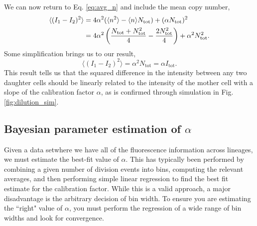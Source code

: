 We can now return to Eq. \ref{eq:avg_n} and include the mean copy number,
\begin{align}
\langle (I_1 - I_2)^2 \rangle &= 4\alpha^2(\langle n^2 \rangle - \langle n \rangle N_\text{tot}) + (\alpha N_\text{tot})^2\\
& = 4\alpha^2\left({N_\text{tot} + N_\text{tot}^2 \over 4} - {2N_\text{tot}^2 \over 4}\right) + \alpha^2N_\text{tot}^2.
\end{align}
Some simplification brings us to our result,
\begin{equation}
\langle (I_1 - I_2)^2 \rangle = \alpha^2 N_\text{tot} = \alpha I_\text{tot}.
\label{eq:golden_rule}
\end{equation}
This result tells us that the squared difference in the intensity between any
two daughter cells should be linearly related to the intensity of the mother
cell with a slope of the calibration factor $\alpha$, as is confirmed through
simulation in Fig. \ref{fig:dilution_sim}.


\begin{figure}
\end{figure}


\subsection*{Bayesian parameter estimation of $\alpha$}
Given a data setwhere we have all of the fluorescence information across lineages,
we must estimate the best-fit value of $\alpha$. This has typically been performed
by combining a given number of division events into bins, computing the relevant
averages, and then performing simple linear regression to find the best fit estimate
for the calibration factor. While this is a valid approach, a major disadvantage
is the arbitrary decision of bin width. To ensure you are estimating the ``right"
value of $\alpha$, you must perform the regression of a wide range of bin widths
and look for convergence.

